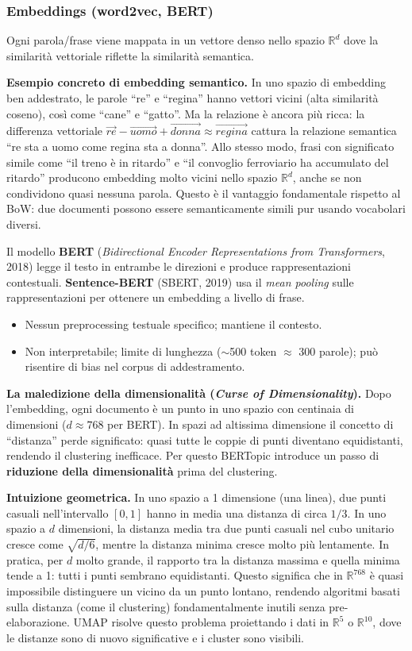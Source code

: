 \documentclass[12pt,a4paper]{article}
\begin{document}
\subsubsection{Embeddings (word2vec, BERT)}
Ogni parola/frase viene mappata in un vettore denso nello spazio $\mathbb{R}^d$ dove
la similarità vettoriale riflette la similarità semantica.

\noindent\textbf{Esempio concreto di embedding semantico.}
In uno spazio di embedding ben addestrato, le parole ``re'' e ``regina'' hanno vettori
vicini (alta similarità coseno), così come ``cane'' e ``gatto''. Ma la relazione è ancora
più ricca: la differenza vettoriale $\vec{re} - \vec{uomo} + \vec{donna} \approx \vec{regina}$
cattura la relazione semantica ``re sta a uomo come regina sta a donna''. Allo stesso modo,
frasi con significato simile come ``il treno è in ritardo'' e ``il convoglio ferroviario
ha accumulato del ritardo'' producono embedding molto vicini nello spazio $\mathbb{R}^d$,
anche se non condividono quasi nessuna parola. Questo è il vantaggio fondamentale rispetto
al BoW: due documenti possono essere semanticamente simili pur usando vocabolari diversi.

Il modello \textbf{BERT} (\textit{Bidirectional Encoder Representations from Transformers}, 2018)
legge il testo in entrambe le direzioni e produce rappresentazioni contestuali.
\textbf{Sentence-BERT} (SBERT, 2019) usa il \textit{mean pooling} sulle rappresentazioni per
ottenere un embedding a livello di frase.
\begin{itemize}
  \item[\checkmark] Nessun preprocessing testuale specifico; mantiene il contesto.
  \item[$\times$] Non interpretabile; limite di lunghezza ($\sim$500 token $\approx$ 300 parole);
        può risentire di bias nel corpus di addestramento.
\end{itemize}

\textbf{La maledizione della dimensionalità (\textit{Curse of Dimensionality}).}
Dopo l'embedding, ogni documento è un punto in uno spazio con centinaia di dimensioni ($d \approx 768$
per BERT). In spazi ad altissima dimensione il concetto di ``distanza'' perde significato: quasi
tutte le coppie di punti diventano equidistanti, rendendo il clustering inefficace. Per questo
BERTopic introduce un passo di \textbf{riduzione della dimensionalità} prima del clustering.

\noindent\textbf{Intuizione geometrica.}
In uno spazio a 1 dimensione (una linea), due punti casuali nell'intervallo $[0,1]$ hanno in
media una distanza di circa $1/3$. In uno spazio a $d$ dimensioni, la distanza media tra due
punti casuali nel cubo unitario cresce come $\sqrt{d/6}$, mentre la distanza minima cresce
molto più lentamente. In pratica, per $d$ molto grande, il rapporto tra la distanza massima
e quella minima tende a 1: tutti i punti sembrano equidistanti. Questo significa che in
$\mathbb{R}^{768}$ è quasi impossibile distinguere un vicino da un punto lontano, rendendo
algoritmi basati sulla distanza (come il clustering) fondamentalmente inutili senza
pre-elaborazione. UMAP risolve questo problema proiettando i dati in $\mathbb{R}^5$ o
$\mathbb{R}^{10}$, dove le distanze sono di nuovo significative e i cluster sono visibili.
\end{document}
